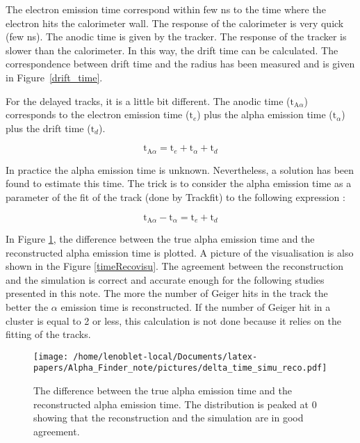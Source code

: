\documentclass[main.tex]{subfiles}
\begin{document}
\noindent The electron emission time correspond within few ns to the time where the electron hits the calorimeter wall. The response of the calorimeter is very quick (few ns). The anodic time is given by the tracker. The response of the tracker is slower than the calorimeter. In this way, the drift time can be calculated. The correspondence between drift time and the radius has been measured and is given in Figure~\ref{drift_time}.


\bigskip


\noindent For the delayed tracks, it is a little bit different. The anodic time ($\text{t}_{\text{A}\alpha}$) corresponds to the electron emission time ($ \text{t}_e$) plus the alpha emission time ($ \text{t}_\alpha$) plus the drift time ($\text{t}_d$). 


$$\text{t}_{\text{A}\alpha} = \text{t}_e + \text{t}_\alpha + \text{t}_d$$


\noindent In practice the alpha emission time is unknown. Nevertheless, a solution has been found to estimate this time. The trick is to consider the alpha emission time as a parameter of the fit of the track (done by Trackfit) to the following expression :


$$\text{t}_{\text{A}\alpha} - \text{t}_\alpha =  \text{t}_e  + \text{t}_d$$


\noindent In Figure \ref{timeReco}, the difference between the true alpha emission time and the reconstructed alpha emission time is plotted. A picture of the visualisation is also shown in the Figure \ref{timeRecovisu}. The agreement between the reconstruction and the simulation is correct and accurate enough for the following studies presented in this note. The more the number of Geiger hits in the track the better the $\alpha$ emission time is reconstructed. If the number of Geiger hit in a cluster is equal to 2 or less, this calculation is not done because it relies on the fitting of the tracks. 


\begin{figure}[h!]
\begin{center}
\texttt{[image: /home/lenoblet-local/Documents/latex-papers/Alpha\_Finder\_note/pictures/delta\_time\_simu\_reco.pdf]}
\caption{The difference between the true alpha emission time and the reconstructed alpha emission time. The distribution is peaked at 0 showing that the reconstruction and the simulation are in good agreement.}
\label{timeReco}
\end{center}
\end{figure}
\end{document}
